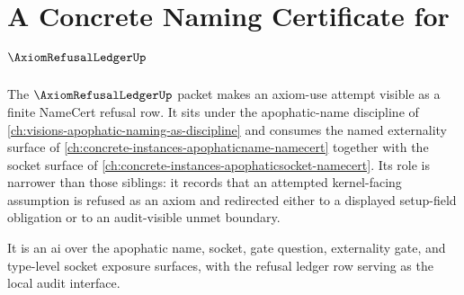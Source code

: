 \chapter{A Concrete Naming Certificate for $\AxiomRefusalLedgerUp$}
\label{ch:concrete-instances-axiom-refusal-ledger-namecert}

The $\AxiomRefusalLedgerUp$ packet makes an axiom-use attempt visible as a finite NameCert refusal row. It sits under the apophatic-name discipline of \autoref{ch:visions-apophatic-naming-as-discipline} and consumes the named externality surface of \autoref{ch:concrete-instances-apophaticname-namecert} together with the socket surface of \autoref{ch:concrete-instances-apophaticsocket-namecert}. Its role is narrower than those siblings: it records that an attempted kernel-facing assumption is refused as an axiom and redirected either to a displayed setup-field obligation or to an audit-visible unmet boundary.

It is an ai over the apophatic name, socket, gate question, externality gate, and type-level socket exposure surfaces, with the refusal ledger row serving as the local audit interface.

